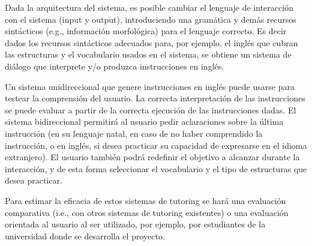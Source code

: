 Dada la arquitectura del sistema, es posible cambiar el lenguaje de
interacci\'on con el sistema (input y output), introduciendo
una gram\'atica y dem\'as recursos sint\'acticos (e.g., informaci\'on
morfol\'ogica) para el lenguaje correcto.  Es decir dados los recursos
sint\'acticos adecuados para, por ejemplo, el ingl\'es que cubran las
estructuras y el vocabulario usados en el sistema, se obtiene un sistema
de di\'alogo que interprete y/o produzca instrucciones en ingl\'es.

Un sistema unidireccional que genere instrucciones en ingl\'es puede
usarse para testear la comprensi\'on del usuario.  La correcta
interpretaci\'on de las instrucciones se puede evaluar a partir de la
correcta ejecuci\'on de las instrucciones dadas.  El sistema
bidireccional permitir\'a al usuario pedir aclaraciones sobre la
\'ultima instrucci\'on (en su lenguaje natal, en caso de no haber comprendido
la instrucci\'on, o en ingl\'es, si desea practicar su
capacidad de expresarse en el idioma extranjero).  El usuario tambi\'en
podr\'a redefinir el objetivo a alcanzar durante la interacci\'on, y
de esta forma seleccionar el vocabulario y el tipo de estructuras que desea
practicar.

Para estimar la eficacia de estos sistemas de tutoring se har\'a una evaluaci\'on comparativa (i.e., con otros
sistemas de tutoring existentes) o una evaluaci\'on orientada al usuario al ser utilizado, por ejemplo, por estudiantes de la universidad donde se desarrolla el proyecto.




